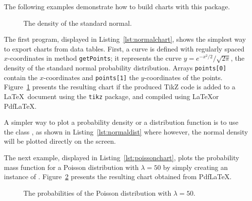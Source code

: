 \begin{latexonly}

The following examples demonstrate how to build charts with this package.



\begin{figure}

\caption{The density of the standard normal.\label{fig:normalchart-res}}
\end{figure}


The first program, displayed in Listing~\ref{lst:normalchart},
shows the simplest way to export charts from data tables.
First, a curve is defined with regularly spaced $x$-coordinates
in method \texttt{getPoints}; it represents the curve
 $y = e^{-x^2/2}/\sqrt{2\pi}$, the density of the standard normal probability
 distribution. Arrays \texttt{points[0]} contain
the $x$-coordinates and \texttt{points[1]} the $y$-coordinates
of the points.
Figure~\ref{fig:normalchart-res} presents the resulting chart if the produced
TikZ code is added to a \LaTeX\ document using the \texttt{tikz}
package, and compiled using \LaTeX or Pdf\LaTeX.




A simpler way to plot a
 probability density or a distribution function is to use the class
, as shown
in Listing~\ref{lst:normaldist}  where however, the normal density will be plotted
directly on the screen.






The next example, displayed in Listing~\ref{lst:poissonchart}, plots the
probability mass function for a Poisson distribution with $\lambda= 50$
by simply creating an instance of
.
Figure~\ref{fig:poissonchart-res} presents the resulting chart obtained
from PdfLaTeX.

\begin{figure}

\caption{The probabilities of the Poisson distribution with $\lambda= 50$.\label{fig:poissonchart-res}}
\end{figure}



\end{latexonly}
